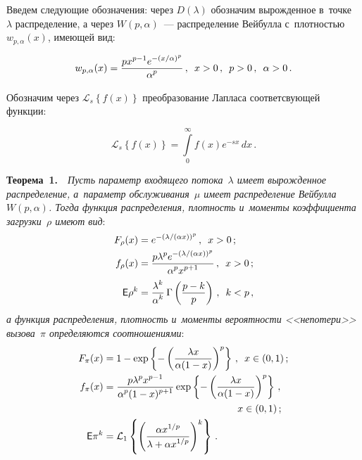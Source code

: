 \begin{multicols}{2}
Введем следующие обозначения: через $D(\lambda)$ обозначим вырожденное в~точке~$\lambda$ 
распределение, а через $W(p,\alpha)$~--- распределение Вейбулла 
с~плот\-ностью $w_{p,\alpha}(x)$, имеющей вид:

\vspace*{2pt}

\noindent
$$
w_{p,\alpha}(x) = \displaystyle\frac{\displaystyle px^{p-1}e^{-({x/\alpha})^{p}}\mathstrut}{\displaystyle {\alpha^{p}}\mathstrut}\,, \enskip x>0\,,\enskip
p>0\,,\enskip \alpha>0\,.
$$

\vspace*{-2pt}

Обозначим через $\mathcal{L}_s\left\lbrace f(x)\right\rbrace$
 преобразование Лап\-ла\-са соответсвующей функции:
 
 \vspace*{2pt}
 
 \noindent
\begin{equation}
\label{Laplas}
\mathcal{L}_s\left\lbrace f(x)\right\rbrace = \int\limits_0^{\infty}f(x)e^{-sx}\,dx\,.
\end{equation}


\noindent
\textbf{Теорема~1.}\ \
\textit{Пусть параметр входящего потока~$\lambda$ имеет вырожденное распределение, 
а~параметр обслуживания~$\mu$ имеет распределение Вейбулла $W(p,\alpha)$. 
Тогда функция распределения, плотность и~моменты коэффициента загрузки~$\rho$ 
имеют вид}:
\begin{align}
F_\rho(x) &= e^{-\left(\lambda/({\alpha x})\right)^{p}}\,, \enskip x>0\,;\notag
\\
f_\rho(x) &= \displaystyle\frac{\displaystyle p\lambda^{p}e^{-({\lambda/(\alpha x)})^{p}}\mathstrut}{\displaystyle {\alpha^{p}x^{p+1}}\mathstrut}\,, \enskip
 x>0\,; \label{DWf_rho}\\
{\sf E}\rho^k &= \displaystyle\frac{\displaystyle \lambda^k\mathstrut}{\displaystyle {\alpha^k}\mathstrut}\,
\Gamma\left(\displaystyle\frac{\displaystyle p-k\mathstrut}{\displaystyle p\mathstrut}\right)\,, \enskip k<p\,,\notag
\end{align}
\textit{а функция распределения, плотность и~моменты вероятности <<непотери>> 
вызова~$\pi$ 
определяются соотношениями}:
\begin{align}
F_\pi(x) &= 1 - \exp\left\lbrace -\left(\fr{\lambda x}{{\alpha(1-x)}}\right)^p\right\rbrace \,, \enskip x\in(0,1)\,;
\notag\\
f_\pi(x) &= \fr{p\lambda^p x^{p-1}}{\alpha^p (1-x)^{p+1}} 
\exp\left\lbrace -\left(\fr{\lambda x}{{\alpha(1-x)}}\right)^p\right\rbrace \,,\notag \\
& \hspace*{48mm}x\in(0,1)\,;
\label{DWf_pi}
\\
{\sf E}\pi^k &=  \mathcal{L}_1\left\lbrace\left(\fr{\alpha x^{1/p}}
{\lambda + \alpha x^{1/p}}\right)^k\right\rbrace\,.\label{DWEpik}
\end{align}



\end{multicols}
